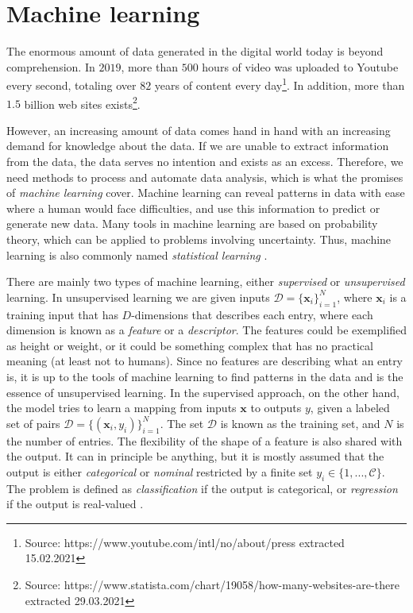 \chapter{Machine learning}

The enormous amount of data generated in the digital world today is beyond comprehension. In $2019$, more than $500$ hours of video was uploaded to Youtube every second, totaling over $82$ years of content every day\footnote{Source: https://www.youtube.com/intl/no/about/press extracted 15.02.2021}. In addition, more than $1.5$ billion web sites exists\footnote{Source: https://www.statista.com/chart/19058/how-many-websites-are-there extracted 29.03.2021}.

However, an increasing amount of data comes hand in hand with an increasing demand for knowledge about the data. If we are unable to extract information from the data, the data serves no intention and exists as an excess. Therefore, we need methods to process and automate data analysis, which is what the promises of \textit{machine learning} cover. Machine learning can reveal patterns in data with ease where a human would face difficulties, and use this information to predict or generate new data. Many tools in machine learning are based on probability theory, which can be applied to problems involving uncertainty. Thus, machine learning is also commonly named \textit{statistical learning} \cite{Murphy2012}.

There are mainly two types of machine learning, either \textit{supervised} or \textit{unsupervised} learning. In unsupervised learning we are given inputs $\mathcal{D}=\{\boldsymbol{x}_i\}^N_{i=1}$, where $\boldsymbol{x}_i$ is a training input that has $D$-dimensions that describes each entry, where each dimension is known as a \textit{feature} or a \textit{descriptor}. The features could be exemplified as height or weight, or it could be something complex that has no practical meaning (at least not to humans). Since no features are describing what an entry is, it is up to the tools of machine learning to find patterns in the data and is the essence of unsupervised learning.
In the supervised approach, on the other hand, the model tries to learn a mapping from inputs $\boldsymbol{x}$ to outputs $y$, given a labeled set of pairs $\mathcal{D}=\{(\boldsymbol{x}_i, y_i)\}^N_{i=1}$. The set $\mathcal{D}$ is known as the training set, and $N$ is the number of entries.
The flexibility of the shape of a feature is also shared with the output. It can in principle be anything, but it is mostly assumed that the output is either \textit{categorical} or \textit{nominal} restricted by a finite set $y_i \in \{1,...,\mathcal{C} \}$. The problem is defined as \textit{classification} if the output is categorical, or \textit{regression} if the output is real-valued \cite{Murphy2012}.

